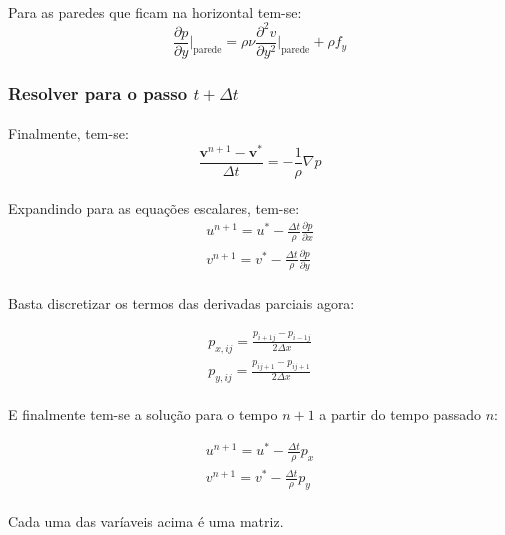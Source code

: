 \documentclass[a4paper,11pt]{article}
\begin{document}
\paragraph{} Para as paredes que ficam na horizontal tem-se:
\begin{equation}
\frac{\partial p}{\partial y}\Bigg|_{\textrm{parede}}=\rho\nu\frac{\partial^2
v}{\partial y^2}\Bigg|_{\textrm{parede}}+\rho f_y
\end{equation}
\subsubsection{Resolver para o passo $t+\Delta t$}
\paragraph{} Finalmente, tem-se:
\begin{equation}
\frac{\textbf{v}^{n+1}-\textbf{v}^*}{\Delta t}=-\frac{1}{\rho}\nabla p
\end{equation}
\paragraph{} Expandindo para as equações escalares, tem-se:
\begin{eqnarray}
u^{n+1}=u^*-\frac{\Delta t}{\rho}\frac{\partial p}{\partial x}\\
v^{n+1}=v^*-\frac{\Delta t}{\rho}\frac{\partial p}{\partial y}
\end{eqnarray}
\paragraph{} Basta discretizar os termos das derivadas parciais agora:

\begin{eqnarray}
p_{x,ij}=\frac{p_{i+1j}-p_{i-1j}}{2\Delta x}\\
p_{y,ij}=\frac{p_{ij+1}-p_{ij+1}}{2\Delta x}
\end{eqnarray}

\paragraph{} E finalmente tem-se a solução para o tempo $n+1$ a partir do tempo passado $n$:

\begin{eqnarray}
u^{n+1}=u^*-\frac{\Delta t}{\rho}p_x\\
v^{n+1}=v^*-\frac{\Delta t}{\rho}p_y
\end{eqnarray}
\paragraph{} Cada uma das varíaveis acima é uma matriz.
\end{document}
